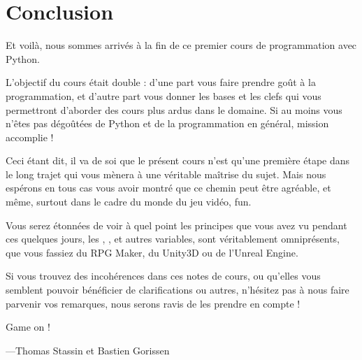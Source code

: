 \chapter{Conclusion}

Et voilà, nous sommes arrivés à la fin de ce premier cours de programmation avec Python.

L'objectif du cours était double : d'une part vous faire prendre goût à la programmation, et d'autre part vous donner les bases et les clefs qui vous permettront d'aborder des cours plus ardus dans le domaine. Si au moins vous n'êtes pas dégoûtées de Python et de la programmation en général, mission accomplie !

Ceci étant dit, il va de soi que le présent cours n'est qu'une première étape dans le long trajet qui vous mènera à une véritable maîtrise du sujet. Mais nous espérons en tous cas vous avoir montré que ce chemin peut être agréable, et même, surtout dans le cadre du monde du jeu vidéo, fun.

Vous serez étonnées de voir à quel point les principes que vous avez vu pendant ces quelques jours, les , ,  et autres variables, sont véritablement omniprésents, que vous fassiez du RPG Maker, du Unity3D ou de l'Unreal Engine.

Si vous trouvez des incohérences dans ces notes de cours, ou qu'elles vous semblent pouvoir bénéficier de clarifications ou autres, n'hésitez pas à nous faire parvenir vos remarques, nous serons ravis de les prendre en compte !

Game on !

---Thomas Stassin et Bastien Gorissen